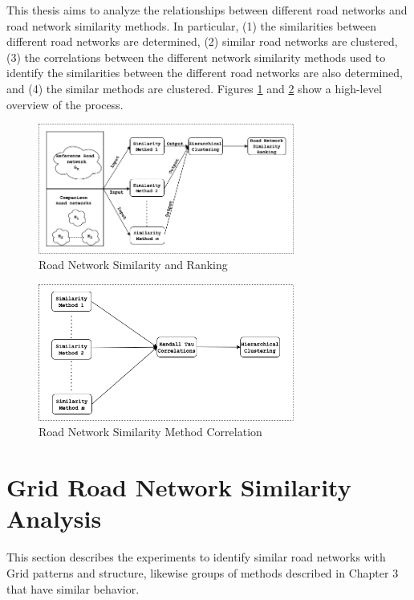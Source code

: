 
This thesis aims to analyze the relationships between different road networks and road network similarity methods. In particular,  (1) the similarities between different road networks are determined, (2) similar road networks are clustered, (3) the correlations between the different network similarity methods used to identify the similarities between the different road networks are also determined, and (4) the similar methods are clustered. Figures \ref{fig:Road Network Similarity and Ranking} and \ref{fig:Road Network Similarity Method Correlation} show a high-level overview of the process. 

\begin{figure}[h]
\centering
\includegraphics[width=0.75\textwidth,center]{picture/network_ranking.png}
\caption[Road Network Similarity and Ranking]{Road Network Similarity and Ranking}
\label{fig:Road Network Similarity and Ranking}
\end{figure}

\begin{figure}[!ht]
\centering
\includegraphics[width=0.75\textwidth,center]{picture/ranking.png}
\caption[Road Network Similarity Method Correlation]{Road Network Similarity Method Correlation}
\label{fig:Road Network Similarity Method Correlation}
\end{figure}


\section{Grid Road Network Similarity Analysis}
This section describes the experiments to identify similar road networks with Grid patterns and structure, likewise groups of methods described in Chapter 3 that have similar behavior.

